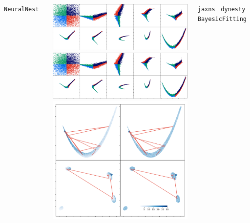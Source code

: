 \documentclass[aspectratio=169]{beamer}
\begin{document}
\begin{frame}
\begin{columns}[t]
        \vfill
        \texttt{NeuralNest}~
        \begin{columns}
            \includegraphics[width=\textwidth]{figures/rosenbrock_flow.png}
            \includegraphics[width=\textwidth]{figures/himmelblau_flow.png}
            \includegraphics[width=\textwidth]{figures/chains.png}
        \end{columns}
        {\small
            \texttt{jaxns}~ \texttt{dynesty}~ 
            \texttt{BayesicFitting}~
}
\end{columns}
\end{frame}
\end{document}
